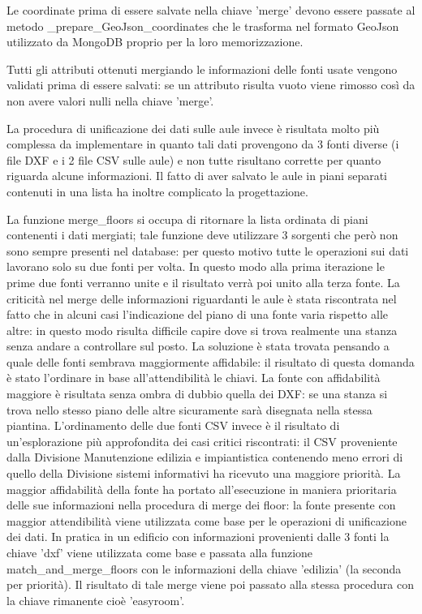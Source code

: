 \documentclass[12pt]{report}
\begin{document}
\vspace{5mm} %

Le coordinate prima di essere salvate nella chiave 'merge' devono essere passate al metodo \_prepare\_GeoJson\_coordinates che le trasforma nel formato GeoJson utilizzato da MongoDB proprio per la loro memorizzazione.

Tutti gli attributi ottenuti mergiando le informazioni delle fonti usate vengono validati prima di essere salvati: se un attributo risulta vuoto viene rimosso così da non avere valori nulli nella chiave 'merge'.

\vspace{5mm} %

La procedura di unificazione dei dati sulle aule invece è risultata molto più complessa da implementare in quanto tali dati provengono da 3 fonti diverse (i file DXF e i 2 file CSV sulle aule) e non tutte risultano corrette per quanto riguarda alcune informazioni. Il fatto di aver salvato le aule in piani separati contenuti in una lista ha inoltre complicato la progettazione.

La funzione merge\_floors si occupa di ritornare la lista ordinata di piani contenenti i dati mergiati; tale funzione deve utilizzare 3 sorgenti che però non sono sempre presenti nel database: per questo motivo tutte le operazioni sui dati lavorano solo su due fonti per volta.
In questo modo alla prima iterazione le prime due fonti verranno unite e il risultato verrà poi unito alla terza fonte.
La criticità nel merge delle informazioni riguardanti le aule è stata riscontrata nel fatto che in alcuni casi l'indicazione del piano di una fonte varia rispetto alle altre: in questo modo risulta difficile capire dove si trova realmente una stanza senza andare a controllare sul posto.
La soluzione è stata trovata pensando a quale delle fonti sembrava maggiormente affidabile: il risultato di questa domanda è stato l'ordinare in base all'attendibilità le chiavi.
La fonte con affidabilità maggiore è risultata senza ombra di dubbio quella dei DXF: se una stanza si trova nello stesso piano delle altre sicuramente sarà disegnata nella stessa piantina. L'ordinamento delle due fonti CSV invece è il risultato di un'esplorazione più approfondita dei casi critici riscontrati: il CSV proveniente dalla Divisione Manutenzione edilizia e impiantistica contenendo meno errori di quello della Divisione sistemi informativi ha ricevuto una maggiore priorità.
La maggior affidabilità della fonte ha portato all'esecuzione in maniera prioritaria delle sue informazioni nella procedura di merge dei floor: la fonte presente con maggior attendibilità viene utilizzata come base per le operazioni di unificazione dei dati.
In pratica in un edificio con informazioni provenienti dalle 3 fonti la chiave 'dxf' viene utilizzata come base e passata alla funzione match\_and\_merge\_floors con le informazioni della chiave 'edilizia' (la seconda per priorità). Il risultato di tale merge viene poi passato alla stessa procedura con la chiave rimanente cioè 'easyroom'.
\end{document}
